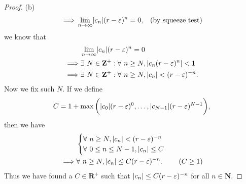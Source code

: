 \begin{proof}{(b)}
\begin{align*}
        \implies & \lim_{n \to \infty} \abs*{c_n} (r - \varepsilon)^n = 0,                                  & \text{(by squeeze test)}
    \end{align*}
    we know that
    \begin{align*}
                 & \lim_{n \to \infty} \abs*{c_n} (r - \varepsilon)^n = 0                                \\
        \implies & \exists\ N \in \mathbf{Z}^+ : \forall\ n \geq N, \abs*{c_n (r - \varepsilon)^n} < 1   \\
        \implies & \exists\ N \in \mathbf{Z}^+ : \forall\ n \geq N, \abs*{c_n} < (r - \varepsilon)^{-n}.
    \end{align*}
    Now we fix such \(N\).
    If we define
    \[
        C = 1 + \max\bigg(\abs*{c_0} (r - \varepsilon)^0, \dots, \abs*{c_{N - 1}} (r - \varepsilon)^{N - 1}\bigg),
    \]
    then we have
    \begin{align*}
                 & \begin{cases}
            \forall\ n \geq N, \abs*{c_n} < (r - \varepsilon)^{-n} \\
            \forall\ 0 \leq n \leq N - 1, \abs*{c_n} \leq C
        \end{cases}                                                \\
        \implies & \forall\ n \geq N, \abs*{c_n} \leq C (r - \varepsilon)^{-n}. & (C \geq 1)
    \end{align*}
    Thus we have found a \(C \in \mathbf{R}^+\) such that \(\abs*{c_n} \leq C (r - \varepsilon)^{-n}\) for all \(n \in \mathbf{N}\).
\end{proof}

